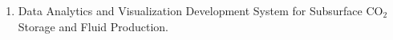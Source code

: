 \begin{enumerate}[label=\arabic*.]
    \item Data Analytics and Visualization Development System for Subsurface CO$_2$ Storage and Fluid Production.
\end{enumerate} 